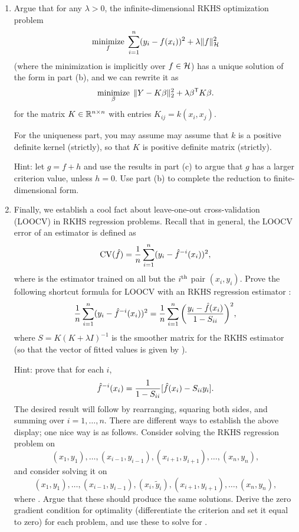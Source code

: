 \documentclass{article}
\begin{document}
\begin{enumerate}[label=(\alph*)]
\item Argue that for any $\lambda > 0$, the infinite-dimensional RKHS
  optimization problem 
  \[
  \mathop{\mathrm{minimize}}_f \; \sum_{i=1}^n (y_i - f(x_i))^2 + \lambda \|f\|_{\mathcal{H}}^2
  \]
  (where the minimization is implicitly over $f \in \mathcal{H}$) has a unique solution
  of the form in part (b), and we can rewrite it as
  \marginpar{\small [2 pts]}
  \[
  \mathop{\mathrm{minimize}}_\beta \; \|Y - K\beta\|_2^2 + \lambda \beta^{\mathsf{T}} K \beta. 
  \]
  for the matrix $K \in \mathbb{R}^{n \times n}$ with entries $K_{ij} = k(x_i, x_j)$. 
  
  For the uniqueness part, you may assume may assume that $k$ is a positive
  definite kernel (strictly), so that $K$ is positive definite matrix
  (strictly). 

  Hint: let $g = f+h$ and use the results in part (c) to argue that $g$ has a
  larger criterion value, unless $h=0$. Use part (b) to complete the reduction
  to finite-dimensional form. 

\item Finally, we establish a cool fact about leave-one-out cross-validation
  (LOOCV) in RKHS regression problems. Recall that in general, the LOOCV error
  of an estimator \smash{$\hf$} is defined as
  \[
  \mathrm{CV}(\hat{f}) = \frac{1}{n} \sum_{i=1}^n (y_i - \hat{f}^{-i}(x_i))^2,
  \]
  where  is the estimator trained on all but the $i^{\text{th}}$ pair 
  $(x_i,y_i)$. Prove the following shortcut formula for LOOCV with an RKHS
  regression estimator \smash{$\hf$}:  
  \marginpar{\small [6 pts]}
  \[
  \frac{1}{n} \sum_{i=1}^n (y_i - \hat{f}^{-i}(x_i))^2 = 
  \frac{1}{n} \sum_{i=1}^n \bigg(\frac{y_i - \hat{f}(x_i)}{1-S_{ii}}\bigg)^2,
  \]
  where $S=K(K + \lambda I)^{-1}$ is the smoother matrix for the RKHS estimator 
  (so that the vector of fitted values is given by ). 

  Hint: prove that for each $i$,
  \[
  \hat{f}^{-i}(x_i) = \frac{1}{1-S_{ii}} [\hat{f}(x_i) - S_{ii}y_i].
  \]
  The desired result will follow by rearranging, squaring both sides, and
  summing over $i=1,\dots,n$. There are different ways to establish the above
  display; one nice way is as follows. Consider solving the RKHS regression
  problem on 
  \[
    (x_1,y_1), \dots, (x_{i-1},y_{i-1}), (x_{i+1},y_{i+1}), \dots, (x_n,y_n), 
  \]
  and consider solving it on 
  \[
    (x_1,y_1), \dots, (x_{i-1},y_{i-1}), (x_i, \tilde{y}_i), (x_{i+1},y_{i+1}),
    \dots, (x_n,y_n), 
  \]
  where . Argue that these should produce
  the same solutions. Derive the zero gradient condition for optimality
  (differentiate the criterion and set it equal to zero) for each problem, and
  use these to solve for . 
\end{enumerate}
\end{document}
